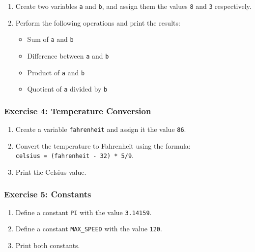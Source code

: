 \documentclass[
  letterpaper,
  DIV=11,
  numbers=noendperiod]{scrreprt}
\providecommand{\tightlist}{%
  \setlength{\itemsep}{0pt}\setlength{\parskip}{0pt}}\usepackage{longtable,booktabs,array}
\begin{document}
\begin{enumerate}
\def\labelenumi{\alph{enumi}.}
\tightlist
\item
  Create two variables \texttt{a} and \texttt{b}, and assign them the
  values \texttt{8} and \texttt{3} respectively.
\item
  Perform the following operations and print the results:

  \begin{itemize}
  \tightlist
  \item
    Sum of \texttt{a} and \texttt{b}
  \item
    Difference between \texttt{a} and \texttt{b}
  \item
    Product of \texttt{a} and \texttt{b}
  \item
    Quotient of \texttt{a} divided by \texttt{b}
  \end{itemize}
\end{enumerate}

\hypertarget{exercise-4-temperature-conversion}{%
\subsubsection{Exercise 4: Temperature
Conversion}\label{exercise-4-temperature-conversion}}

\begin{enumerate}
\def\labelenumi{\alph{enumi}.}
\tightlist
\item
  Create a variable \texttt{fahrenheit} and assign it the value
  \texttt{86}.
\item
  Convert the temperature to Fahrenheit using the formula:
  \texttt{celsius\ =\ (fahrenheit\ -\ 32)\ *\ 5/9}.
\item
  Print the Celsius value.
\end{enumerate}

\hypertarget{exercise-5-constants}{%
\subsubsection{Exercise 5: Constants}\label{exercise-5-constants}}

\begin{enumerate}
\def\labelenumi{\alph{enumi}.}
\tightlist
\item
  Define a constant \texttt{PI} with the value \texttt{3.14159}.
\item
  Define a constant \texttt{MAX\_SPEED} with the value \texttt{120}.
\item
  Print both constants.
\end{enumerate}
\end{document}
